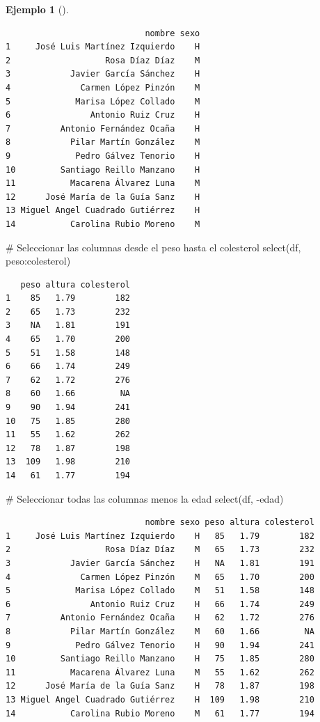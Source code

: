 \documentclass[
  spanish,
  a4paper,
]{scrreport}
\newenvironment{Shaded}{\begin{snugshade}}{\end{snugshade}}
\newcommand{\CommentTok}[1]{\textcolor[rgb]{0.37,0.37,0.37}{#1}}
\newcommand{\FunctionTok}[1]{\textcolor[rgb]{0.28,0.35,0.67}{#1}}
\newcommand{\NormalTok}[1]{\textcolor[rgb]{0.00,0.23,0.31}{#1}}
\newcommand{\SpecialCharTok}[1]{\textcolor[rgb]{0.37,0.37,0.37}{#1}}
\theoremstyle{definition}
\theoremstyle{definition}
\newtheorem{example}{Ejemplo}[chapter]
\theoremstyle{remark}
\begin{document}
\begin{example}[]
\begin{verbatim}
                            nombre sexo
1     José Luis Martínez Izquierdo    H
2                   Rosa Díaz Díaz    M
3            Javier García Sánchez    H
4              Carmen López Pinzón    M
5             Marisa López Collado    M
6                Antonio Ruiz Cruz    H
7          Antonio Fernández Ocaña    H
8            Pilar Martín González    M
9             Pedro Gálvez Tenorio    H
10         Santiago Reillo Manzano    H
11           Macarena Álvarez Luna    M
12      José María de la Guía Sanz    H
13 Miguel Angel Cuadrado Gutiérrez    H
14           Carolina Rubio Moreno    M
\end{verbatim}

\begin{Shaded}
\begin{Highlighting}[]
\CommentTok{\# Seleccionar las columnas desde el peso hasta el colesterol}
\FunctionTok{select}\NormalTok{(df, peso}\SpecialCharTok{:}\NormalTok{colesterol)}
\end{Highlighting}
\end{Shaded}

\begin{verbatim}
   peso altura colesterol
1    85   1.79        182
2    65   1.73        232
3    NA   1.81        191
4    65   1.70        200
5    51   1.58        148
6    66   1.74        249
7    62   1.72        276
8    60   1.66         NA
9    90   1.94        241
10   75   1.85        280
11   55   1.62        262
12   78   1.87        198
13  109   1.98        210
14   61   1.77        194
\end{verbatim}

\begin{Shaded}
\begin{Highlighting}[]
\CommentTok{\# Seleccionar todas las columnas menos la edad}
\FunctionTok{select}\NormalTok{(df, }\SpecialCharTok{{-}}\NormalTok{edad)}
\end{Highlighting}
\end{Shaded}

\begin{verbatim}
                            nombre sexo peso altura colesterol
1     José Luis Martínez Izquierdo    H   85   1.79        182
2                   Rosa Díaz Díaz    M   65   1.73        232
3            Javier García Sánchez    H   NA   1.81        191
4              Carmen López Pinzón    M   65   1.70        200
5             Marisa López Collado    M   51   1.58        148
6                Antonio Ruiz Cruz    H   66   1.74        249
7          Antonio Fernández Ocaña    H   62   1.72        276
8            Pilar Martín González    M   60   1.66         NA
9             Pedro Gálvez Tenorio    H   90   1.94        241
10         Santiago Reillo Manzano    H   75   1.85        280
11           Macarena Álvarez Luna    M   55   1.62        262
12      José María de la Guía Sanz    H   78   1.87        198
13 Miguel Angel Cuadrado Gutiérrez    H  109   1.98        210
14           Carolina Rubio Moreno    M   61   1.77        194
\end{verbatim}

\end{example}
\end{document}
